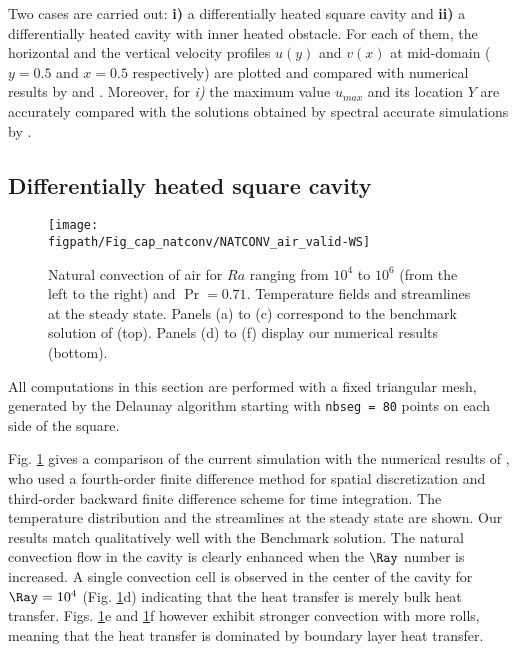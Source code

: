 Two cases are carried out: \textbf{ i)} a differentially heated square cavity and \textbf{ ii)} a differentially heated cavity with inner heated obstacle.
For each of them, the horizontal and the vertical velocity profiles $u(y)$ and $v(x)$ at mid-domain ($y=0.5$ and $x=0.5$ respectively) are plotted and compared with numerical results by \cite{LeQuere91} and \cite{Raluca2013}. 
Moreover, for \textit{ i)} the maximum value $u_{max}$ and its location $Y$ are accurately compared with the solutions obtained by spectral accurate simulations by \cite{LeQuere91}.

\subsection{Differentially heated square cavity} \label{sub-diff-heated}

\begin{figure}[!h]
	\begin{center}
		\texttt{[image: \\figpath/Fig\_cap\_natconv/NATCONV\_air\_valid-WS]} 
	\end{center}
	\caption{Natural convection of air for $Ra$ ranging from $10^4$ to $10^6$ (from the left to the right) and $\Pr = 0.71$. Temperature fields and streamlines at the steady state. Panels (a) to (c) correspond to the benchmark solution of \cite{Wakashima-2004} (top). Panels (d) to (f) display our numerical results (bottom).}
	\label{fig-natconv-field}
\end{figure}

All computations in this section are performed with a fixed triangular mesh, generated by the Delaunay algorithm starting with \texttt{nbseg = 80} points on each side of the square.

Fig. \ref{fig-natconv-field} gives a comparison of the current simulation with the numerical results of \cite{Wakashima-2004}, who
used a fourth-order finite difference method for spatial discretization and third-order backward finite difference scheme for time integration.
The temperature distribution and the streamlines at the steady state are shown.
Our results match qualitatively well with the Benchmark solution.
The natural convection flow in the cavity is clearly enhanced when the $\Ray$ number is increased.
A single convection cell is observed in the center of the cavity for $\Ray = 10^4$ (Fig. \ref{fig-natconv-field}d) indicating that the heat transfer is merely bulk heat transfer.
Figs. \ref{fig-natconv-field}e and \ref{fig-natconv-field}f however exhibit stronger convection with more rolls, meaning that the heat transfer is dominated by boundary layer heat transfer.

